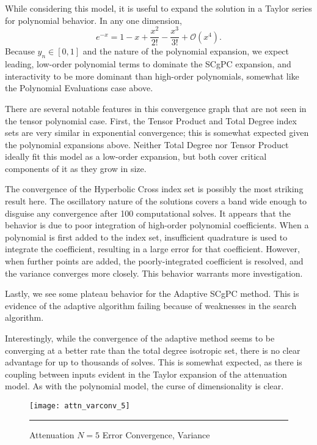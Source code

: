 While considering this model, it is useful to expand the solution in a Taylor series for polynomial behavior.
In any one dimension,
\begin{equation}
  e^{-x} = 1 - x + \frac{x^2}{2!} - \frac{x^3}{3!} + \mathcal{O}(x^4).
\end{equation}
Because $y_n\in[0,1]$ and the nature of the polynomial expansion, we expect leading, low-order polynomial
terms to dominate the SCgPC expansion, and interactivity to be more dominant than high-order polynomials,
somewhat like the Polynomial Evaluations case above.

There are several notable features in this convergence graph that are not seen in the tensor polynomial case.
First, the Tensor Product and Total Degree index sets are very similar in exponential convergence; this is
somewhat expected given the polynomial expansions above.  Neither Total Degree nor Tensor Product ideally fit
this model as a low-order expansion, but both cover critical components of it as they grow in size.

The convergence of the Hyperbolic Cross index set is possibly the most striking result here.  The oscillatory
nature of the solutions covers a band wide enough to disguise any convergence after 100 computational solves.
It appears that the behavior is due to poor integration of high-order polynomial coefficients.  When a
polynomial is first added to the index set, insufficient quadrature is used to integrate the coefficient,
resulting in a large error for that coefficient.  However, when further points are added, the
poorly-integrated coefficient is resolved, and the variance converges more closely.  This behavior warrants
more investigation.

Lastly, we see some plateau behavior for the Adaptive SCgPC method. This is evidence of the adaptive algorithm
failing because of weaknesses in the search algorithm.



Interestingly, while the convergence of the adaptive method seems to be converging at a better rate than the
total degree isotropic set, there is no clear advantage for up to thousands of solves.  This is somewhat
expected, as there is coupling between inputs evident in the Taylor expansion of the attenuation model.  
As with the polynomial model,
the curse of dimensionality is clear.

\begin{figure}[H]
  \centering
    \texttt{[image: attn\_varconv\_5]}
    \rule{35em}{0.5pt}
  \caption{Attenuation $N=5$ Error Convergence, Variance}
  \label{fig:att5_varconv}
\end{figure}

